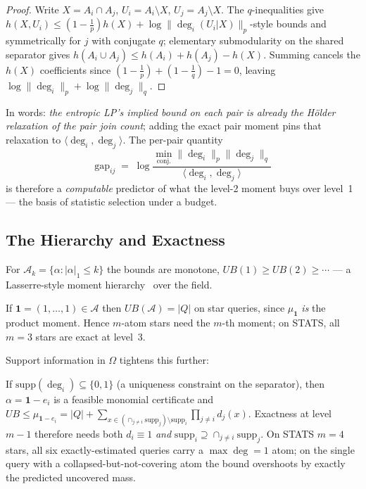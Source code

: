 \begin{proof}
Write $X = A_i\cap A_j$, $U_i = A_i \setminus X$, $U_j = A_j\setminus
X$.  The $q$-inequalities give
$h(X,U_i) \le (1-\frac1p)h(X) + \log\|\deg_i(U_i|X)\|_p$-style bounds
and symmetrically for $j$ with conjugate $q$; elementary
submodularity on the shared separator gives
$h(A_i\cup A_j) \le h(A_i) + h(A_j) - h(X)$.  Summing cancels the
$h(X)$ coefficients since $(1-\tfrac1p)+(1-\tfrac1q)-1 = 0$, leaving
$\log\|\deg_i\|_p + \log\|\deg_j\|_q$.
\end{proof}

\noindent In words: \emph{the entropic LP's implied bound on each pair
is already the H\"older relaxation of the pair join count}; adding
the exact pair moment pins that relaxation to
$\langle \deg_i,\deg_j\rangle$.  The per-pair quantity
\begin{equation}
\mathrm{gap}_{ij} \;=\; \log \frac{\min_{\text{conj.}}\|\deg_i\|_p\|\deg_j\|_q}
{\langle \deg_i, \deg_j \rangle}
\label{eq:gap}
\end{equation}
is therefore a \emph{computable} predictor of what the level-2 moment
buys over level~1 --- the basis of statistic selection under a
budget.

\subsection{The Hierarchy and Exactness}
\label{sec:hier}

For $\mathcal{A}_k = \{\alpha : |\alpha|_1 \le k\}$ the bounds are
monotone, $UB(1) \ge UB(2) \ge \cdots$ --- a Lasserre-style moment
hierarchy~\cite{lasserre2001} over the field.

\begin{proposition}
\label{prop:exact}
If $\mathbf{1} = (1,\dots,1) \in \mathcal{A}$ then
$UB(\mathcal{A}) = |Q|$ on star queries, since $\mu_{\mathbf{1}}$
\emph{is} the product moment.  Hence $m$-atom stars need the $m$-th
moment; on STATS, all $m{=}3$ stars are exact at level~3.
\end{proposition}

Support information in $\Omega$ tightens this further:

\begin{lemma}
\label{lem:collapse}
If $\mathrm{supp}(\deg_i) \subseteq \{0,1\}$ (a uniqueness constraint
on the separator), then $\alpha = \mathbf{1} - e_i$ is a feasible
monomial certificate and
$UB \le \mu_{\mathbf{1}-e_i} = |Q| +
\sum_{x\in(\cap_{j\ne i}\mathrm{supp}_j)\setminus \mathrm{supp}_i}
\prod_{j\ne i} d_j(x)$.  Exactness at level $m{-}1$ therefore needs
both $d_i \equiv 1$ \emph{and} $\mathrm{supp}_i \supseteq
\cap_{j\ne i}\mathrm{supp}_j$.  On STATS $m{=}4$ stars, all six
exactly-estimated queries carry a $\max\deg{=}1$ atom; on the single
query with a collapsed-but-not-covering atom the bound overshoots by
exactly the predicted uncovered mass.
\end{lemma}


